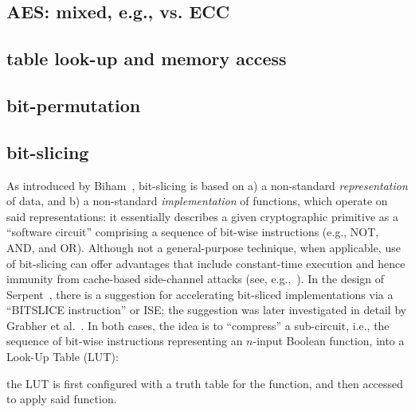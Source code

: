 \subsection*{AES: mixed, e.g., vs. ECC}
\cite{SCARV:TilGro:05,SCARV:TilGro:07:b}

\subsection*{table look-up and memory access}
\cite{SCARV:FisLee:01,SCARV:FisLee:05:a,SCARV:FisLee:05:b,SCARV:HilYinLee:08}

\subsection*{bit-permutation}
\cite{SCARV:ShiLee:00,SCARV:YanLee:00,SCARV:McGLee:01,SCARV:LeeShiYan:01,SCARV:ShiLee:02,SCARV:ShiYanLee:03,SCARV:LSYRR:04,MASCAB:LeeYanShi:05,SCARV:HilYinLee:08,SCARV:HilLee:08,SCARV:ShiYanLee:08}
\subsection*{bit-slicing}
As introduced by Biham~\cite{SCARV:Biham:97}, bit-slicing is based on
a) a non-standard {\em representation} of data,
   and
b) a non-standard {\em implementation} of functions, which operate on
   said representations:
it essentially describes a given cryptographic primitive as a  ``software 
circuit'' comprising a sequence of bit-wise instructions (e.g., NOT, AND, 
and OR).  Although not a general-purpose technique, when applicable, use
of bit-slicing can offer advantages that include constant-time execution 
and hence immunity from cache-based side-channel attacks
(see, e.g.,~\cite{SCARV:KasSch:09}).
In the design of Serpent~\cite[Page 232]{SCARV:BihAndKnu:98}, there is a
suggestion for accelerating bit-sliced implementations via a ``BITSLICE 
instruction'' or ISE; the suggestion was later investigated in detail by 
Grabher et al.~\cite{SCARV:GraGroPag:08}.  In both cases, the idea is to 
``compress'' a sub-circuit, i.e., the sequence of bit-wise instructions 
representing an $n$-input Boolean function, into a Look-Up Table (LUT): 

the LUT is first configured with a truth table for the function, and then 
accessed to apply said function.  

